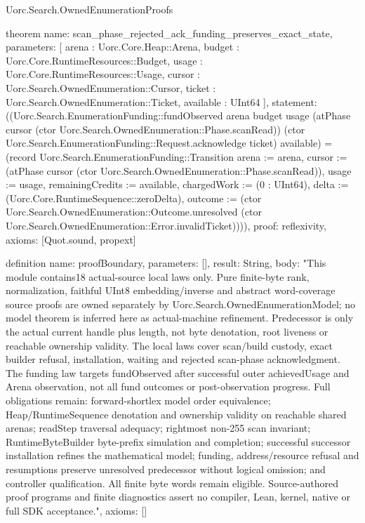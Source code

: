 \begin{lexlean}{Uorc.Search.OwnedEnumerationProofs}
\begin{semanticmodule}
theorem{
  name: scan_phase_rejected_ack_funding_preserves_exact_state,
  parameters: [
    arena : Uorc.Core.Heap::Arena,
    budget : Uorc.Core.RuntimeResources::Budget,
    usage : Uorc.Core.RuntimeResources::Usage,
    cursor : Uorc.Search.OwnedEnumeration::Cursor,
    ticket : Uorc.Search.OwnedEnumeration::Ticket,
    available : UInt64
  ],
  statement: ((Uorc.Search.EnumerationFunding::fundObserved arena budget usage (atPhase cursor (ctor Uorc.Search.OwnedEnumeration::Phase.scanRead)) (ctor Uorc.Search.EnumerationFunding::Request.acknowledge ticket) available) = (record Uorc.Search.EnumerationFunding::Transition {arena := arena, cursor := (atPhase cursor (ctor Uorc.Search.OwnedEnumeration::Phase.scanRead)), usage := usage, remainingCredits := available, chargedWork := (0 : UInt64), delta := (Uorc.Core.RuntimeSequence::zeroDelta), outcome := (ctor Uorc.Search.OwnedEnumeration::Outcome.unresolved (ctor Uorc.Search.OwnedEnumeration::Error.invalidTicket))})),
  proof: reflexivity{},
  axioms: [Quot.sound, propext]
}

definition{
  name: proofBoundary,
  parameters: [],
  result: String,
  body: "This module contains18 actual-source local laws only. Pure finite-byte rank, normalization, faithful UInt8 embedding/inverse and abstract word-coverage source proofs are owned separately by Uorc.Search.OwnedEnumerationModel; no model theorem is inferred here as actual-machine refinement. Predecessor is only the actual current handle plus length, not byte denotation, root liveness or reachable ownership validity. The local laws cover scan/build custody, exact builder refusal, installation, waiting and rejected scan-phase acknowledgment. The funding law targets fundObserved after successful outer achievedUsage and Arena observation, not all fund outcomes or post-observation progress. Full obligations remain: forward-shortlex model order equivalence; Heap/RuntimeSequence denotation and ownership validity on reachable shared arenas; readStep traversal adequacy; rightmost non-255 scan invariant; RuntimeByteBuilder byte-prefix simulation and completion; successful successor installation refines the mathematical model; funding, address/resource refusal and resumptions preserve unresolved predecessor without logical omission; and controller qualification. All finite byte words remain eligible. Source-authored proof programs and finite diagnostics assert no compiler, Lean, kernel, native or full SDK acceptance.",
  axioms: []
}
\end{semanticmodule}
\end{lexlean}
